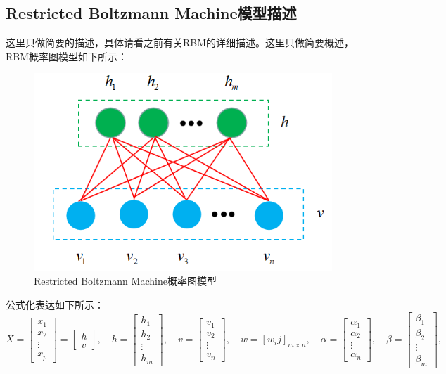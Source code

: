 \documentclass[a4paper]{article}
\begin{document}
\subsection{Restricted Boltzmann Machine模型描述}
这里只做简要的描述，具体请看之前有关RBM的详细描述。这里只做简要概述，RBM概率图模型如下所示：
\begin{figure}[H]
    \centering
    \includegraphics[width=.45\textwidth]{微信图片_20200311150228.png}
    \caption{Restricted Boltzmann Machine概率图模型}
    \label{fig:my_label_1}
\end{figure}
公式化表达如下所示：
\begin{equation}
    X = \begin{bmatrix}
    x_1 \\
    x_2 \\
    \vdots \\
    x_p
    \end{bmatrix}
    = 
    \begin{bmatrix}
    h \\
    v
    \end{bmatrix}
    ,\quad
    h = 
    \begin{bmatrix}
    h_1 \\
    h_2\\
    \vdots \\
    h_m
    \end{bmatrix}
    ,\quad
    v = 
    \begin{bmatrix}
    v_1 \\
    v_2\\
    \vdots \\
    v_n
    \end{bmatrix},\quad
    w = [w_ij]_{m\times n}, \quad
    \alpha = 
    \begin{bmatrix}
    \alpha_1 \\
    \alpha_2\\
    \vdots \\
    \alpha_n
    \end{bmatrix},\quad
    \beta = 
    \begin{bmatrix}
    \beta_1 \\
    \beta_2\\
    \vdots \\
    \beta_m
    \end{bmatrix},\quad
\end{equation}
\end{document}
